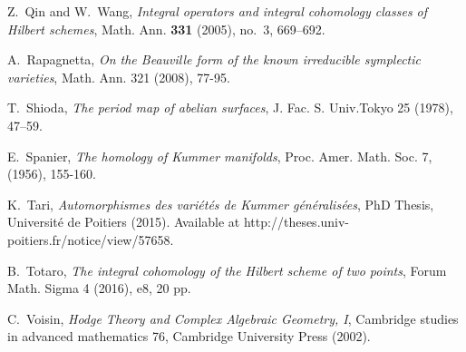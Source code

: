 \documentclass{alggeom}
\theoremstyle{plain}
\theoremstyle{definition}
\theoremstyle{remark}
\begin{document}
\begin{thebibliography}{10}
Z.~Qin and W.~Wang, \emph{Integral operators and integral cohomology classes of
  {H}ilbert schemes}, Math. Ann. \textbf{331} (2005), no.~3, 669--692.

A.~Rapagnetta,
\emph{On the Beauville form of the known irreducible symplectic varieties},
Math. Ann.
321 (2008), 77-95.


T.~Shioda, \emph{The period map of abelian surfaces}, J. Fac. S. Univ.Tokyo 25 (1978), 47--59.

E.~Spanier, 
\emph{The homology of Kummer manifolds},
Proc. Amer. Math. Soc.
7, (1956), 155-160.

K.~Tari, 
\emph{Automorphismes des vari\'et\'es de Kummer g\'en\'eralis\'ees},
PhD Thesis, Universit\'e de Poitiers (2015).
Available at http://theses.univ-poitiers.fr/notice/view/57658.

B.~Totaro, \emph{The integral cohomology of the Hilbert scheme of two points}, 
Forum Math. Sigma 4 (2016), e8, 20 pp.

C.~Voisin, \emph{Hodge Theory and Complex Algebraic Geometry, I},
  Cambridge studies in advanced mathematics 76, Cambridge University Press (2002).

\end{thebibliography}
\end{document}
